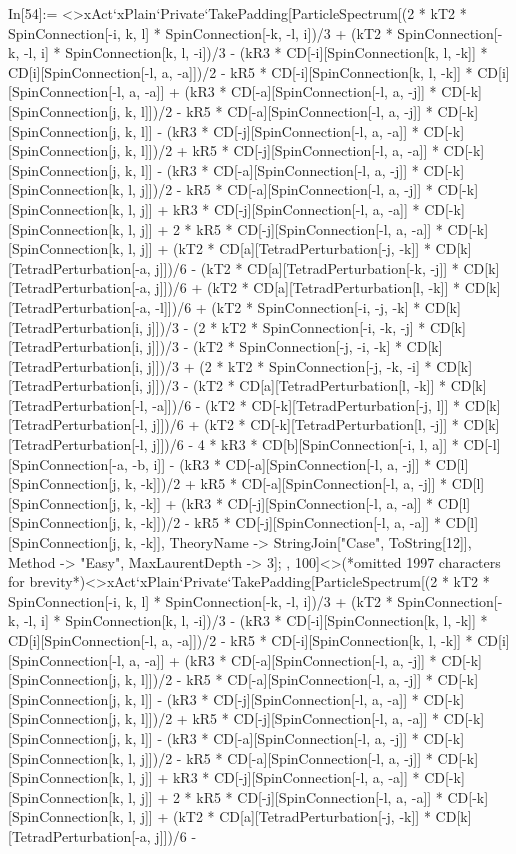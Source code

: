 In[54]:= <>xAct`xPlain`Private`TakePadding[ParticleSpectrum[(2 * kT2 * SpinConnection[-i, k, l] * SpinConnection[-k, -l, i])/3 + (kT2 * SpinConnection[-k, -l, i] * SpinConnection[k, l, -i])/3 - (kR3 * CD[-i][SpinConnection[k, l, -k]] * CD[i][SpinConnection[-l, a, -a]])/2 - kR5 * CD[-i][SpinConnection[k, l, -k]] * CD[i][SpinConnection[-l, a, -a]] + (kR3 * CD[-a][SpinConnection[-l, a, -j]] * CD[-k][SpinConnection[j, k, l]])/2 - kR5 * CD[-a][SpinConnection[-l, a, -j]] * CD[-k][SpinConnection[j, k, l]] - (kR3 * CD[-j][SpinConnection[-l, a, -a]] * CD[-k][SpinConnection[j, k, l]])/2 + kR5 * CD[-j][SpinConnection[-l, a, -a]] * CD[-k][SpinConnection[j, k, l]] - (kR3 * CD[-a][SpinConnection[-l, a, -j]] * CD[-k][SpinConnection[k, l, j]])/2 - kR5 * CD[-a][SpinConnection[-l, a, -j]] * CD[-k][SpinConnection[k, l, j]] + kR3 * CD[-j][SpinConnection[-l, a, -a]] * CD[-k][SpinConnection[k, l, j]] + 2 * kR5 * CD[-j][SpinConnection[-l, a, -a]] * CD[-k][SpinConnection[k, l, j]] + (kT2 * CD[a][TetradPerturbation[-j, -k]] * CD[k][TetradPerturbation[-a, j]])/6 - (kT2 * CD[a][TetradPerturbation[-k, -j]] * CD[k][TetradPerturbation[-a, j]])/6 + (kT2 * CD[a][TetradPerturbation[l, -k]] * CD[k][TetradPerturbation[-a, -l]])/6 + (kT2 * SpinConnection[-i, -j, -k] * CD[k][TetradPerturbation[i, j]])/3 - (2 * kT2 * SpinConnection[-i, -k, -j] * CD[k][TetradPerturbation[i, j]])/3 - (kT2 * SpinConnection[-j, -i, -k] * CD[k][TetradPerturbation[i, j]])/3 + (2 * kT2 * SpinConnection[-j, -k, -i] * CD[k][TetradPerturbation[i, j]])/3 - (kT2 * CD[a][TetradPerturbation[l, -k]] * CD[k][TetradPerturbation[-l, -a]])/6 - (kT2 * CD[-k][TetradPerturbation[-j, l]] * CD[k][TetradPerturbation[-l, j]])/6 + (kT2 * CD[-k][TetradPerturbation[l, -j]] * CD[k][TetradPerturbation[-l, j]])/6 - 4 * kR3 * CD[b][SpinConnection[-i, l, a]] * CD[-l][SpinConnection[-a, -b, i]] - (kR3 * CD[-a][SpinConnection[-l, a, -j]] * CD[l][SpinConnection[j, k, -k]])/2 + kR5 * CD[-a][SpinConnection[-l, a, -j]] * CD[l][SpinConnection[j, k, -k]] + (kR3 * CD[-j][SpinConnection[-l, a, -a]] * CD[l][SpinConnection[j, k, -k]])/2 - kR5 * CD[-j][SpinConnection[-l, a, -a]] * CD[l][SpinConnection[j, k, -k]], TheoryName -> StringJoin["Case", ToString[12]], Method -> "Easy", MaxLaurentDepth -> 3]; , 100]<>(*omitted 1997 characters for brevity*)<>xAct`xPlain`Private`TakePadding[ParticleSpectrum[(2 * kT2 * SpinConnection[-i, k, l] * SpinConnection[-k, -l, i])/3 + (kT2 * SpinConnection[-k, -l, i] * SpinConnection[k, l, -i])/3 - (kR3 * CD[-i][SpinConnection[k, l, -k]] * CD[i][SpinConnection[-l, a, -a]])/2 - kR5 * CD[-i][SpinConnection[k, l, -k]] * CD[i][SpinConnection[-l, a, -a]] + (kR3 * CD[-a][SpinConnection[-l, a, -j]] * CD[-k][SpinConnection[j, k, l]])/2 - kR5 * CD[-a][SpinConnection[-l, a, -j]] * CD[-k][SpinConnection[j, k, l]] - (kR3 * CD[-j][SpinConnection[-l, a, -a]] * CD[-k][SpinConnection[j, k, l]])/2 + kR5 * CD[-j][SpinConnection[-l, a, -a]] * CD[-k][SpinConnection[j, k, l]] - (kR3 * CD[-a][SpinConnection[-l, a, -j]] * CD[-k][SpinConnection[k, l, j]])/2 - kR5 * CD[-a][SpinConnection[-l, a, -j]] * CD[-k][SpinConnection[k, l, j]] + kR3 * CD[-j][SpinConnection[-l, a, -a]] * CD[-k][SpinConnection[k, l, j]] + 2 * kR5 * CD[-j][SpinConnection[-l, a, -a]] * CD[-k][SpinConnection[k, l, j]] + (kT2 * CD[a][TetradPerturbation[-j, -k]] * CD[k][TetradPerturbation[-a, j]])/6 - 